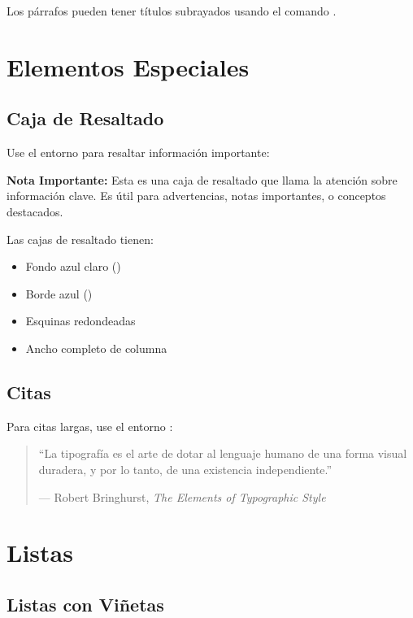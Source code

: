 \documentclass{pt-article}
\begin{document}
Los párrafos pueden tener títulos subrayados usando el comando
.

\section{Elementos Especiales}

\subsection{Caja de Resaltado}

Use el entorno  para resaltar información importante:

\begin{highlightbox}
\textbf{Nota Importante:} Esta es una caja de resaltado que llama la atención
sobre información clave. Es útil para advertencias, notas importantes, o
conceptos destacados.
\end{highlightbox}

Las cajas de resaltado tienen:
\begin{itemize}
    \item Fondo azul claro ()
    \item Borde azul ()
    \item Esquinas redondeadas
    \item Ancho completo de columna
\end{itemize}

\subsection{Citas}

Para citas largas, use el entorno :

\begin{quotation}
``La tipografía es el arte de dotar al lenguaje humano de una forma visual
duradera, y por lo tanto, de una existencia independiente.''

--- Robert Bringhurst, \textit{The Elements of Typographic Style}
\end{quotation}

\section{Listas}

\subsection{Listas con Viñetas}
\end{document}
